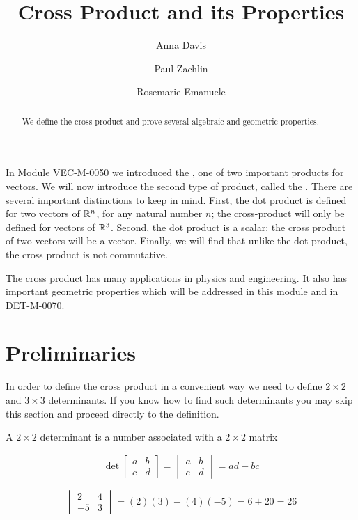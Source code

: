 \documentclass{ximera}
\author{Anna Davis \and Paul Zachlin \and Rosemarie Emanuele} \title{Cross Product and its Properties} \license{CC-BY 4.0}
\begin{document}
\begin{abstract}
 We define the cross product and prove several algebraic and geometric properties.
\end{abstract}
\maketitle

In Module VEC-M-0050 we introduced the , one of two important products for vectors.  We will now introduce the second type of product, called the .  There are several important distinctions to keep in mind.  First, the dot product is defined for two vectors of $\mathbb{R}^n$, for any  natural number $n$; the cross-product will only be defined for vectors of $\mathbb{R}^3$.  Second, the dot product is a scalar; the cross product of two vectors will be a vector.  Finally, we will find that unlike the dot product, the cross product is not commutative.  

The cross product has many applications in physics and engineering.  It also has important geometric properties which will be addressed in this module and in DET-M-0070.

\section*{Preliminaries}
In order to define the cross product in a convenient way we need to define $2\times 2$ and $3\times 3$ determinants.  If you know how to find such determinants you may skip this section and proceed directly to the definition.

\begin{definition}
A $2\times 2$ determinant is a number associated with a $2\times 2$ matrix

$$\det{\begin{bmatrix}
a & b\\
c & d
\end{bmatrix}}=\begin{vmatrix}
a & b\\
c & d
\end{vmatrix} =ad-bc$$

\end{definition}

\begin{example} 
$$\begin{vmatrix}
2 & 4\\
-5 & 3
\end{vmatrix} =(2)(3)-(4)(-5)=6+20=26$$
\end{example}
\end{document}
